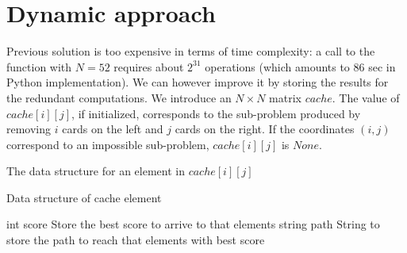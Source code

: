 \documentclass{article}
\begin{document}
\section{Dynamic approach}


Previous solution is too expensive in terms of time complexity: a call to the function with $N=52$ requires about $2^{31}$ operations (which amounts to 86 sec in Python implementation). We can however improve it by storing the results for the redundant computations. We introduce an $N\times N$ matrix $cache$. The value of $cache[i][j]$, if initialized, corresponds to the sub-problem produced by removing $i$ cards on the left and $j$ cards on the right. If the coordinates $(i,j)$ correspond to an impossible sub-problem, $cache[i][j]$ is $None$.

The data structure for an element in $cache[i][j]$
\begin{algorithm}[H]
\begin{algorithmic}
\caption{Data structure of cache element}
\State int score \Comment Store the best score to arrive to that elements
\State string path \Comment String to store the path to reach that elements with best score
\end{algorithmic}
\end{algorithm}
\end{document}
